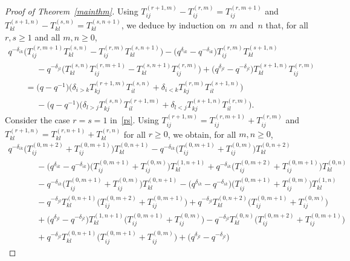 \documentclass[pdftex]{sigma}
\numberwithin{theorem}{section}
\numberwithin{proposition}{section}
\numberwithin{lemma}{section}
\numberwithin{corollary}{section}
\numberwithin{definition}{section}
\numberwithin{example}{section}
\numberwithin{remark}{section}
\numberwithin{note}{section}
\numberwithin{equation}{section}
\begin{document}
\begin{proof}[Proof of Theorem~\ref{mainthm}]
Using $T_{ij}^{(r+1,m)} - T_{ij}^{(r,m)}=T_{ij}^{(r,m+1)}$ and $T_{kl}^{(s+1,n)} - T_{kl}^{(s,n)}=T_{kl}^{(s,n+1)}$, we
deduce by induction on~$m$ and~$n$ that, for all $r,s \geq 1$ and all $m,n\ge 0$,
\begin{gather}
q^{-\delta_{ik}} \big(T_{ij}^{(r,m+1)}T_{kl}^{(s,n)} - T_{ij}^{(r,m)} T_{kl}^{(s,n+1)} \big) - \big(q^{\delta_{ik}} -
q^{-\delta_{ik}}\big) T_{ij}^{(r,m)} T_{kl}^{(s+1,n)}
\nonumber
\\
\qquad\phantom{=}{}
  - q^{-\delta_{jl}} \big(T_{kl}^{(s,n)} T_{ij}^{(r,m+1)} - T_{kl}^{(s,n+1)} T_{ij}^{(r,m)} \big) + \big(q^{\delta_{jl}} -
q^{-\delta_{jl}}\big) T_{kl}^{(s+1,n)} T_{ij}^{(r,m)}
\nonumber
\\
\qquad
= \big(q-q^{-1}\big) \big(  \delta_{i>k} T_{kj}^{(r+1,m)} T_{il}^{(s,n)} + \delta_{i<k} T_{kj}^{(r,m)} T_{il}^{(s+1,n)}\big)
\nonumber
\\
\qquad\phantom{=}{}
  - \big(q-q^{-1}\big) \big(\delta_{l>j} T_{kj}^{(s,n)} T_{il}^{(r+1,m)} + \delta_{l<j} T_{kj}^{(s+1,n)} T_{il}^{(r,m)} \big).
\label{rs}
\end{gather}
Consider the case $r=s=1$ in~\eqref{rs}.
Using $T_{ij}^{(r+1,m)}=T_{ij}^{(r,m+1)}+T_{ij}^{(r,m)}$ and $T_{kl}^{(r+1,n)}=T_{kl}^{(r,n+1)}+T_{kl}^{(r,n)}$ for all
$r\ge 0$, we obtain, for all $m,n\ge 0$,
\begin{gather*}
  q^{-\delta_{ik}} \big(T_{ij}^{(0,m+2)} + T_{ij}^{(0,m+1)}\big) T_{kl}^{(0,n+1)} -
q^{-\delta_{ik}}\big(T_{ij}^{(0,m+1)} + T_{ij}^{(0,m)}\big) T_{kl}^{(0,n+2)}
\\
\qquad\phantom{=}{}
  - \big(q^{\delta_{ik}} - q^{-\delta_{ik}}\big) \big(T_{ij}^{(0,m+1)} + T_{ij}^{(0,m)}\big) T_{kl}^{(1,n+1)} + q^{-\delta_{ik}}
\big(T_{ij}^{(0,m+2)} + T_{ij}^{(0,m+1)}\big) T_{kl}^{(0,n)}
\\
\qquad\phantom{=}{}
  - q^{-\delta_{ik}}\big(T_{ij}^{(0,m+1)} + T_{ij}^{(0,m)}\big) T_{kl}^{(0,n+1)} - \big(q^{\delta_{ik}} -
q^{-\delta_{ik}}\big)\big(T_{ij}^{(0,m+1)} + T_{ij}^{(0,m)}\big) T_{kl}^{(1,n)}
\\
\qquad\phantom{=}{}
  - q^{-\delta_{jl}} T_{kl}^{(0,n+1)} \big(T_{ij}^{(0,m+2)} + T_{ij}^{(0,m+1)}\big) +
q^{-\delta_{jl}}T_{kl}^{(0,n+2)}\big(T_{ij}^{(0,m+1)} + T_{ij}^{(0,m)}\big)
\\
\qquad\phantom{=}{}
  + \big(q^{\delta_{jl}} - q^{-\delta_{jl}}\big) T_{kl}^{(1,n+1)} \big(T_{ij}^{(0,m+1)} + T_{ij}^{(0,m)}\big) - q^{-\delta_{jl}}
T_{kl}^{(0,n)} \big(T_{ij}^{(0,m+2)} + T_{ij}^{(0,m+1)}\big)
\\
\qquad\phantom{=}{}
  + q^{-\delta_{jl}}T_{kl}^{(0,n+1)} \big(T_{ij}^{(0,m+1)} + T_{ij}^{(0,m)}\big) + \big(q^{\delta_{jl}} - q^{-\delta_{jl}}\big)

\end{gather*}
\end{proof}
\end{document}
